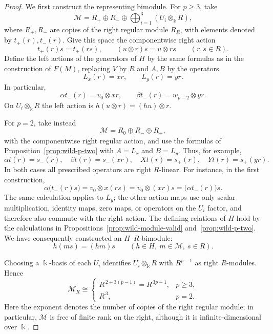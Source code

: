 \documentclass[10pt,oneside]{amsart}
\newcommand{\kk}{\Bbbk}
\theoremstyle{definition}
\begin{document}
\begin{proof}
We first construct the representing bimodule. For $p\ge3$, take
\[
 \mathcal M=R_+\oplus R_-\oplus
       \bigoplus_{i=1}^3(U_i\otimes_{\kk}R),
\]
where $R_+,R_-$ are copies of the right regular module $R_R$,
with elements denoted by $t_+(r),t_-(r)$. Give this space the
componentwise right action
\[
 t_\pm(r)s=t_\pm(rs),\qquad
 (u\otimes r)s=u\otimes rs\qquad(r,s\in R).
\]
Define the left actions of the generators of $H$ by the same
formulas as in the construction of $F(M)$, replacing $V$ by $R$
and $A,B$ by the operators
\[
 L_x(r)=xr,\qquad L_y(r)=yr.
\]
In particular,
\[
 \alpha t_-(r)=v_0\otimes xr,\qquad
 \beta t_-(r)=w_{p-2}\otimes yr.
\]
On $U_i\otimes_{\kk}R$ the left action is
$h(u\otimes r)=(hu)\otimes r$.

For $p=2$, take instead
\[
 \mathcal M=R_0\oplus R_-\oplus R_+,
\]
with the componentwise right regular action, and use the formulas
of Proposition~\ref{prop:wild-p-two} with $A=L_x$ and $B=L_y$.
Thus, for example,
\[
 \alpha t(r)=s_-(r),\quad \beta t(r)=s_-(xr),\quad
 Xt(r)=s_+(r),\quad Yt(r)=s_+(yr).
\]
In both cases all prescribed operators are right $R$-linear.
For instance, in the first construction,
\[
 \alpha\bigl(t_-(r)s\bigr)
 =v_0\otimes x(rs)
 =v_0\otimes(xr)s
 =\bigl(\alpha t_-(r)\bigr)s.
\]
The same calculation applies to $L_y$; the other action maps use
only scalar multiplication, identity maps, zero maps, or operators
on the $U_i$ factor, and therefore also commute with the right action.
The defining relations of $H$ hold by the calculations in
Propositions~\ref{prop:wild-module-valid} and~\ref{prop:wild-p-two}.
 We have consequently constructed an $H$--$R$-bimodule:
\[
 h(ms)=(hm)s
 \qquad(h\in H,\ m\in\mathcal M,\ s\in R).
\]

Choosing a $\kk$-basis of each $U_i$ identifies
$U_i\otimes_{\kk}R$ with $R^{p-1}$ as right $R$-modules. Hence
\[
 \mathcal M_R\cong
 \begin{cases}
 R^{\,2+3(p-1)}=R^{\,3p-1},&p\ge3,\\
 R^{\,3},&p=2.
 \end{cases}
\]
Here the exponent denotes the number of copies of the right regular
module; in particular, $\mathcal M$ is free of finite rank on the
right, although it is infinite-dimensional over $\kk$.


\end{proof}
\end{document}
